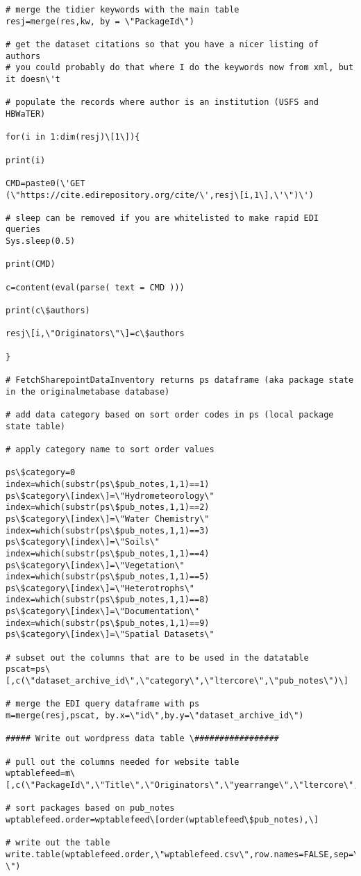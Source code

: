 \documentclass[
  letterpaper,
  DIV=11,
  numbers=noendperiod]{scrreprt}
\begin{document}
\begin{verbatim}
# merge the tidier keywords with the main table
resj=merge(res,kw, by = \"PackageId\")

# get the dataset citations so that you have a nicer listing of authors
# you could probably do that where I do the keywords now from xml, but
it doesn\'t

# populate the records where author is an institution (USFS and
HBWaTER)

for(i in 1:dim(resj)\[1\]){

print(i)

CMD=paste0(\'GET
(\"https://cite.edirepository.org/cite/\',resj\[i,1\],\'\")\')

# sleep can be removed if you are whitelisted to make rapid EDI queries
Sys.sleep(0.5)

print(CMD)

c=content(eval(parse( text = CMD )))

print(c\$authors)

resj\[i,\"Originators\"\]=c\$authors

}

# FetchSharepointDataInventory returns ps dataframe (aka package state
in the originalmetabase database)

# add data category based on sort order codes in ps (local package
state table)

# apply category name to sort order values

ps\$category=0
index=which(substr(ps\$pub_notes,1,1)==1)
ps\$category\[index\]=\"Hydrometeorology\"
index=which(substr(ps\$pub_notes,1,1)==2)
ps\$category\[index\]=\"Water Chemistry\"
index=which(substr(ps\$pub_notes,1,1)==3)
ps\$category\[index\]=\"Soils\"
index=which(substr(ps\$pub_notes,1,1)==4)
ps\$category\[index\]=\"Vegetation\"
index=which(substr(ps\$pub_notes,1,1)==5)
ps\$category\[index\]=\"Heterotrophs\"
index=which(substr(ps\$pub_notes,1,1)==8)
ps\$category\[index\]=\"Documentation\"
index=which(substr(ps\$pub_notes,1,1)==9)
ps\$category\[index\]=\"Spatial Datasets\"

# subset out the columns that are to be used in the datatable
pscat=ps\[,c(\"dataset_archive_id\",\"category\",\"ltercore\",\"pub_notes\")\]

# merge the EDI query dataframe with ps
m=merge(resj,pscat, by.x=\"id\",by.y=\"dataset_archive_id\")

##### Write out wordpress data table \#################

# pull out the columns needed for website table
wptablefeed=m\[,c(\"PackageId\",\"Title\",\"Originators\",\"yearrange\",\"ltercore\",\"edilink\",\"category\",\"pub_notes\",\"Keywords\")\]

# sort packages based on pub_notes
wptablefeed.order=wptablefeed\[order(wptablefeed\$pub_notes),\]

# write out the table
write.table(wptablefeed.order,\"wptablefeed.csv\",row.names=FALSE,sep=\",\",na=\"
\")
\end{verbatim}
\end{document}
